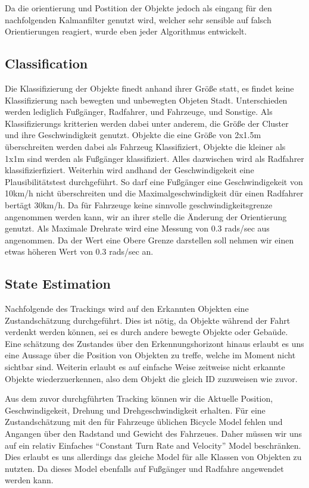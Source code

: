 \documentclass[11pt,oneside,openright]{mpreport}
\begin{document}
Da die orientierung und Postition der Objekte jedoch als eingang für den nachfolgenden Kalmanfilter genutzt wird, welcher sehr sensible auf falsch Orientierungen reagiert, wurde eben jeder Algorithmus
entwickelt.




\subsection{Classification}

Die Klassifizierung der Objekte finedt anhand ihrer Größe statt, es findet keine Klassifizierung nach bewegten und unbewegten Objeten Stadt.
Unterschieden werden lediglich Fußgänger, Radfahrer, und Fahrzeuge, und Sonstige. Als Klassifizierungs kritterien werden dabei unter anderem, die Größe der Cluster und ihre Geschwindigkeit genutzt.
Objekte die eine Größe von 2x1.5m überschreiten werden dabei als Fahrzeug Klassifiziert, Objekte die kleiner als 1x1m sind werden als Fußgänger klassifiziert. Alles dazwischen wird als Radfahrer klassifizierfiziert.
Weiterhin wird andhand der Geschwindigekeit eine Plausibilitätstest durchgeführt. So darf eine Fußgänger eine Geschwindigekeit von 10km/h nicht überschreiten und die Maximalgeschwindigkeit dür einen 
Radfahrer bertägt 30km/h. Da für Fahrzeuge keine sinnvolle geschwindigkeitsgrenze angenommen werden kann, wir an ihrer stelle die Änderung der Orientierung genutzt. Als Maximale Drehrate wird
eine Messung von 0.3 rads/sec aus \cite{Kelly1994} angenommen. Da der Wert eine Obere Grenze darstellen soll nehmen wir einen etwas höheren  Wert von  0.3 rads/sec an.



\subsection{State Estimation}

Nachfolgende des Trackings wird auf den Erkannten Objekten eine Zustandschätzung durchgeführt. Dies ist nötig, da Objekte während der Fahrt verdenkt werden können,
sei es durch andere bewegte Objekte oder Gebaüde. Eine schätzung des Zustandes über den Erkennungshorizont hinaus erlaubt es uns eine Aussage über die Position von
Objekten zu treffe, welche im Moment nicht sichtbar sind. Weiterin erlaubt es auf einfache Weise zeitweise nicht erkannte Objekte wiederzuerkennen, also dem Objekt
die gleich ID zuzuweisen wie zuvor. 

Aus dem zuvor durchgführten Tracking können wir die Aktuelle Position, Geschwindigekeit, Drehung und Drehgeschwindigkeit erhalten. 
Für eine Zustandschätzung mit den für Fahrzeuge üblichen Bicycle Model fehlen und Angangen über den Radstand und Gewicht des Fahrzeues.
Daher müssen wir uns auf ein relativ Einfaches ``Constant Turn Rate and Velocity'' Model beschränken. Dies erlaubt es uns allerdings das gleiche
Model für alle Klassen von Objekten zu nutzten. Da dieses Model ebenfalls auf Fußgänger und Radfahre angewendet werden kann.
\end{document}
